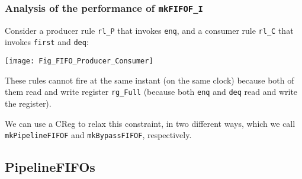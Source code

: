 
\begin{frame}[fragile]
\frametitle{Analysis of the performance of {\tt mkFIFOF\_I}}

\footnotesize

Consider a producer rule \verb|rl_P| that invokes \verb|enq|, and a
consumer rule \verb|rl_C| that invokes \verb|first| and \verb|deq|:

\vspace{4ex}

\begin{center}
 \texttt{[image: Fig\_FIFO\_Producer\_Consumer]}
\end{center}

\vspace{4ex}

These rules cannot fire at the same instant (on the same clock)
because both of them read and write register \verb|rg_Full| (because
both \verb|enq| and \verb|deq| read and write the register).

\vspace{2ex}

We can use a CReg to relax this constraint, in two different ways,
which we call {\tt mkPipelineFIFOF} and {\tt mkBypassFIFOF},
respectively.

\end{frame}


\subsection{PipelineFIFOs}

